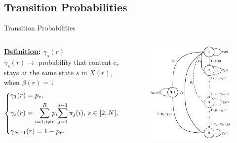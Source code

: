 \documentclass[
	xcolor={svgnames},
	hyperref={pagebackref,bookmarks},
	aspectratio=43,
]{beamer}
\begin{document}
\subsection*{Transition Probabilities}
\begin{frame}{Transition Probabilities}
    \begin{columns}
        \textbf{\underline{Definition}: \boldmath$\gamma_s(r)$} \\ \vspace*{1mm}
            $\gamma_s(r) \rightarrow$ probability that content $c_r$ stays at the same state $s$ in $X(r)$, when $\beta(r) = 1$
            \begin{equation}
                \begin{dcases*}
                    \gamma_1(r) = p_r, \\
                    \gamma_s(r) = \sum_{i = 1, i \neq r}^{R} \!\!\!p_i\!\sum_{j = 1}^{s - 1} \pi_j(i), \, s \in \lbrack2, N\rbrack, \\
                    \gamma_{N+1}(r) = 1 - p_r.
                \end{dcases*}
            \end{equation}
        \begin{figure}
            \centering
            \includegraphics[scale=0.24]{macs0.jpeg}
        \end{figure}
    \end{columns}
\end{frame}
\end{document}
